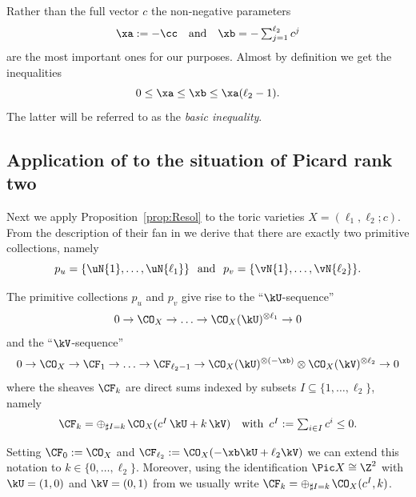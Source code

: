 \begin{rema}
\label{rem:effective}
Rather than the full vector $c$ the non-negative 
parameters
$$
\textstyle
\xa:=-\cc
\hspace{1em}\mbox{and}\hspace{1em}
\xb=-\sum_{j=1}^{\ell_2} c^j
$$
are the most important ones for our purposes.
Almost by definition we get the inequalities 
\begin{equation}\label{eq:EffIneq}
0\leq\xa\leq\xb\leq\xa(\ell_2-1).
\end{equation}
The latter will be referred to as the 
{\em basic inequality}.
\end{rema}

\subsection{Application of \texorpdfstring{ }{}
to the situation of Picard rank two}
\label{subsec:appPicTwo}
Next we apply Proposition~\ref{prop:Resol} 
to the toric varieties $X=(\ell_1,\ell_2;c)$. 
From the description of their fan in
 we derive that there are 
exactly two primitive collections,
namely
$$
p_u=\{\uN{1},\ldots,\uN{\ell_1}\}
\hspace{0.7em}\mbox{and}\hspace{0.7em}
p_v=\{\vN{1}, \ldots,\vN{\ell_2}\}.
$$

\begin{coro}
\label{coro:resol}
The primitive collections $p_u$ and $p_v$ give 
rise to the ``$\kU$-sequence'' 
$$
0\to\CO_X\to\ldots\to\CO_X(\kU)^{\otimes\ell_1}\to 0
$$
and the ``$\kV$-sequence''
$$
0 \to \CO_X\to\CF_1\to\ldots \to \CF_{\ell_2-1}
\to\CO_X(\kU)^{\otimes(-\xb)}\otimes
\CO_X(\kV)^{\otimes\ell_2}\to 0
$$
where the sheaves $\CF_k$ are direct sums 
indexed by subsets $I\subseteq\{1,\ldots,\ell_2\}$, 
namely
$$
\textstyle
\CF_k=\oplus_{\sharp I=k\,}\CO_X(c^I\,\kU+k\,\kV)
\hspace{1em}\mbox{with}\hspace{0.5em}
c^I:=\sum_{i\in I}c^i\leq 0.
$$
\end{coro}

\begin{rema}
Setting $\CF_0:=\CO_X$ and 
$\CF_{\ell_2}:=\CO_X(-\xb\kU+\ell_2\kV)$ 
we can extend this notation to 
$k\in\{0,\ldots,\ell_2\}$. Moreover, 
using the identification $\Pic X\cong\Z^2$ 
with $\kU=(1,0)$ and $\kV=(0,1)$ from 
 we usually write 
$\CF_k=\oplus_{\sharp I=k\,}\CO_X(c^I,k)$.
\end{rema}

